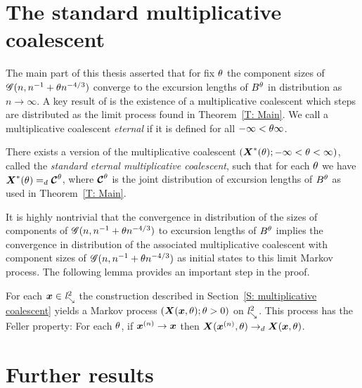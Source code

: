 \section{The standard multiplicative coalescent}

The main part of this thesis asserted that for fix $\theta$ the component sizes of $\mathscr{G}(n, n^{-1} + \theta n^{-4/3})$ converge to the excursion lengths of $B^{\theta}$
in distribution as $n \rightarrow \infty$.
A key result of \cite{Aldous.1997} is the existence of a multiplicative coalescent which steps are distributed as the limit process found in Theorem~\ref{T: Main}.
We call a multiplicative coalescent \emph{eternal} if it is defined for all $-\infty < \theta \infty$.

\begin{theorem}
	There exists a version of the multiplicative coalescent
	$ (\boldsymbol{X}^*(\theta); -\infty < \theta < \infty) $,
	called the \emph{standard eternal multiplicative coalescent},
	such that for each $\theta$ we have $\boldsymbol{X}^*(\theta) =_d \boldsymbol{\mathcal{C}}^{\theta}$,
	where $\boldsymbol{\mathcal{C}}^{\theta}$ is the joint distribution of excursion lengths of $B^{\theta}$ as used in Theorem~\ref{T: Main}.
\end{theorem}

It is highly nontrivial that the convergence in distribution of the sizes of components of $\mathscr{G}(n, n^{-1} + \theta n^{-4/3})$ to
excursion lengths of $B^{\theta}$ implies the convergence in distribution of the associated multiplicative coalescent 
with component sizes of $\mathscr{G}(n, n^{-1} + \theta n^{-4/3})$ as initial states to this limit Markov process.
The following lemma provides an important step in the proof.

\begin{lemma}
	For each $\boldsymbol{x} \in \mathit{l}^2_{\searrow}$ the construction described in Section~\ref{S: multiplicative coalescent} yields a Markov process
	$(\boldsymbol{X}(\boldsymbol{x}, \theta); \theta > 0)$ on $\mathit{l}^2_{\searrow}$. This process has the Feller property:
	For each $\theta$, if $\boldsymbol{x}^{(n)} \rightarrow \boldsymbol{x}$ then $\boldsymbol{X}(\boldsymbol{x}^{(n)}, \theta) \rightarrow_d \boldsymbol{X}(\boldsymbol{x}, \theta)$.
	
\end{lemma}



\section{Further results}
